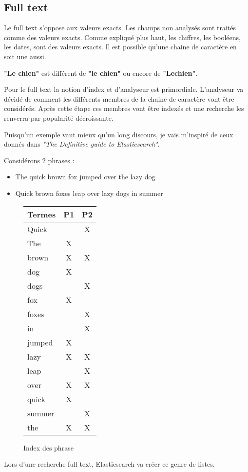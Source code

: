 \subsection{Full text}
\label{subsec:elasticfulltext}
Le full text s'oppose aux valeurs exacts.
Les champs non analysés sont traités comme des valeurs exacts.
Comme expliqué plus haut, les chiffres, les booléens, les dates, sont des valeurs 
exacts. Il est possible qu'une chaine de caractère en soit une aussi.

\textbf{"Le chien"} est différent de \textbf{"le chien"} ou encore de \textbf{"Lechien"}.

Pour le full text la notion d'index et d'analyseur est primordiale. L'analyseur va
décidé de comment les différents membres de la chaine de caractère vont être considérés.
Après cette étape ces membres vont être indexés et une recherche les renverra par 
popularité décroissante.

Puisqu'un exemple vaut mieux qu'un long discours, je vais m'inspiré de ceux donnés
dans \textit{"The Definitive guide to Elasticsearch"}.


Considérons 2 phrases :
\begin{itemize}
    \item The quick brown fox jumped over the lazy dog
    \item Quick brown foxes leap over lazy dogs in summer
\end{itemize}

\begin{figure}[H]
\center
\begin{tabular}{|l||c|c|}
\hline
\textbf{Termes}   & \textbf{P1}    & \textbf{P2}\\ \hline  
Quick   &       &  X\\ \hline  
The     &   X   &   \\ \hline
brown   &   X   &  X\\ \hline
dog     &   X   &   \\ \hline
dogs    &       &  X\\ \hline
fox     &   X   &   \\ \hline
foxes   &       &  X\\ \hline
in      &       &  X\\ \hline
jumped  &   X   &   \\ \hline
lazy    &   X   &  X\\ \hline
leap    &       &  X\\ \hline
over    &   X   &  X\\ \hline
quick   &   X   &   \\ \hline
summer  &       &  X\\ \hline
the     &   X   &  X\\ \hline 
\end{tabular}
\caption{Index des phrase}
\end{figure}
Lors d'une recherche full text, Elasticsearch va créer ce genre de listes.


